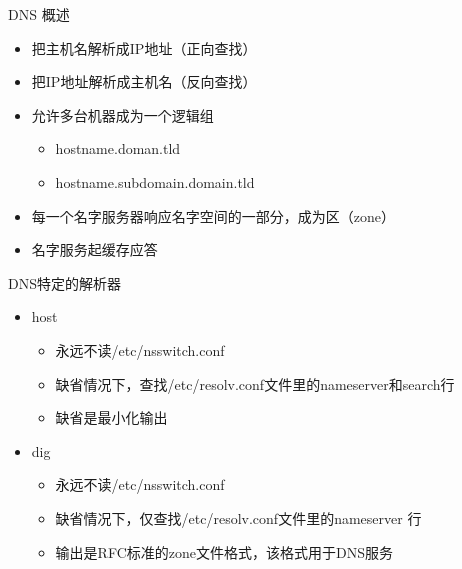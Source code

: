 \begin{frame}{DNS 概述}
\begin{itemize}
\item 把主机名解析成IP地址（正向查找）
\item 把IP地址解析成主机名（反向查找）
\item 允许多台机器成为一个逻辑组

\begin{itemize}
\item hostname.doman.tld
\item hostname.subdomain.domain.tld
\end{itemize}
\item 每一个名字服务器响应名字空间的一部分，成为区（zone）
\item 名字服务起缓存应答
\end{itemize}



\end{frame} 
\begin{frame}{DNS特定的解析器}
\begin{itemize}
\item host

\begin{itemize}
\item 永远不读/etc/nsswitch.conf
\item 缺省情况下，查找/etc/resolv.conf文件里的nameserver和search行
\item 缺省是最小化输出
\end{itemize}
\item dig

\begin{itemize}
\item 永远不读/etc/nsswitch.conf
\item 缺省情况下，仅查找/etc/resolv.conf文件里的nameserver 行
\item 输出是RFC标准的zone文件格式，该格式用于DNS服务
\end{itemize}
\end{itemize}

\end{frame} 
